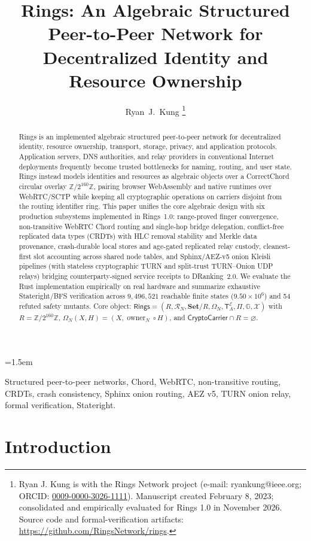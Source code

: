 \documentclass[journal]{IEEEtran}
\title{Rings: An Algebraic Structured Peer-to-Peer Network for Decentralized Identity and Resource Ownership}
\author{Ryan~J.~Kung%
\thanks{Ryan J. Kung is with the Rings Network project (e-mail: ryankung@ieee.org; ORCID: \href{https://orcid.org/0009-0000-3026-1111}{0009-0000-3026-1111}). Manuscript created February 8, 2023; consolidated and empirically evaluated for Rings 1.0 in November 2026. Source code and formal-verification artifacts: \url{https://github.com/RingsNetwork/rings}.}}
\begin{document}
\maketitle
\emergencystretch=1.5em

\begin{abstract}
Rings is an implemented algebraic structured peer-to-peer network for decentralized identity, resource ownership, transport, storage, privacy, and application protocols. Application servers, DNS authorities, and relay providers in conventional Internet deployments frequently become trusted bottlenecks for naming, routing, and user state. Rings instead models identities and resources as algebraic objects over a CorrectChord circular overlay $\mathbb{Z}/2^{160}\mathbb{Z}$, pairing browser WebAssembly and native runtimes over WebRTC/SCTP while keeping all cryptographic operations on carriers disjoint from the routing identifier ring. This paper unifies the core algebraic design with six production subsystems implemented in Rings~1.0: range-proved finger convergence, non-transitive WebRTC Chord routing and single-hop bridge delegation, conflict-free replicated data types (CRDTs) with HLC removal stability and Merkle data provenance, crash-durable local stores and age-gated replicated relay custody, cleanest-first slot accounting across shared node tables, and Sphinx/AEZ-v5 onion Kleisli pipelines (with stateless cryptographic TURN and split-trust TURN--Onion UDP relays) bridging counterparty-signed service receipts to DRanking~2.0. We evaluate the Rust implementation empirically on real hardware and summarize exhaustive Stateright/BFS verification across $9,496,521$ reachable finite states ($9.50\times 10^6$) and 54 refuted safety mutants. Core object: $\mathsf{Rings}=(R,\mathcal{R}_N,\mathbf{Set}/R,\Omega_N,\mathsf{T}^{\mathcal{E}}_A,\Pi,\mathbb{G},\mathcal{X})$ with $R=\mathbb{Z}/2^{160}\mathbb{Z}$, $\Omega_N(X,H)=(X,\operatorname{owner}_N\circ H)$, and $\mathsf{CryptoCarrier}\cap R=\varnothing$.
\end{abstract}

\begin{IEEEkeywords}
Structured peer-to-peer networks, Chord, WebRTC, non-transitive routing, CRDTs, crash consistency, Sphinx onion routing, AEZ v5, TURN onion relay, formal verification, Stateright.
\end{IEEEkeywords}

\section{Introduction}
\end{document}
